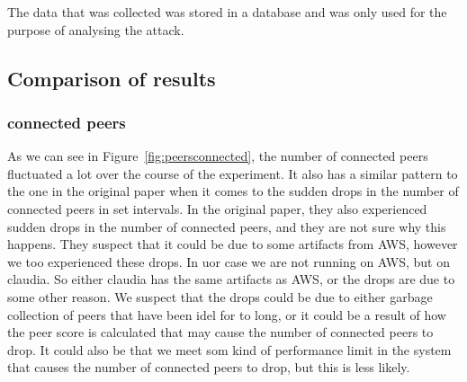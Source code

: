 The data that was collected was stored in a database and was only used for the purpose of analysing the attack.

\subsection{Comparison of results}\label{subsec:res-comparison}

\subsubsection{connected peers}\label{subsubsec:connected-peers}
As we can see in Figure~\ref{fig:peersconnected}, the number of connected peers fluctuated a lot over the course of the experiment.
It also has a similar pattern to the one in the original paper when it comes to the sudden drops in the number of connected peers in set intervals.
In the original paper, they also experienced sudden drops in the number of connected peers, and they are not sure why this happens.
They suspect that it could be due to some artifacts from AWS, however we too experienced these drops.
In uor case we are not running on AWS, but on claudia.
So either claudia has the same artifacts as AWS, or the drops are due to some other reason.
We suspect that the drops could be due to either garbage collection of peers that have been idel for to long, or it could be a result of how the peer score is calculated that may cause the number of connected peers to drop.
It could also be that we meet som kind of performance limit in the system that causes the number of connected peers to drop, but this is less likely.
